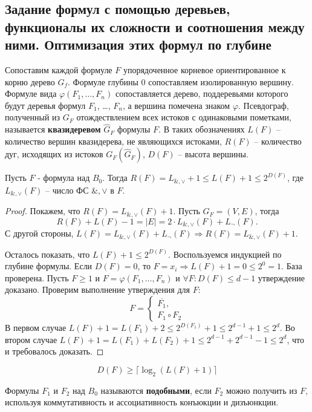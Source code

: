 \documentclass[11pt]{article}
\newcounter{th}\setcounter{th}{0}
\newcounter{cnsqnc}\setcounter{cnsqnc}{0}
\def\cnsqnc{\par\smallskip\refstepcounter{cnsqnc}\textbf{\arabic{cnsqnc}}}
\newtheorem*{Consequence}{Следствие \cnsqnc}
\newcounter{stnmt}\setcounter{stnmt}{0}
\def\st{\par\smallskip\refstepcounter{stnmt}\textbf{\arabic{stnmt}}}
\newtheorem*{Statement}{Утверждение \st}
\begin{document}
\subsection{Задание формул с помощью деревьев, функционалы их сложности и соотношения между ними. Оптимизация этих формул по глубине}
\label{sec:orga1d77b5}
Сопоставим каждой формуле \(F\) упорядоченное корневое ориентированное к корню дерево \(G_f\).
Формуле глубины \(0\) сопоставляем изолированную вершину. Формуле вида \(\varphi(F_1, \ldots, F_n)\)
сопоставляется дерево, поддеревьями которого будут деревья формул \(F_1\), \ldots, \(F_n\), а вершина
помечена знаком \(\varphi\). Псевдограф, полученный из \(G_F\) отождествлением всех истоков с
одинаковыми пометками, называется \textbf{квазидеревом} \(\hat{G}_F\) формулы \(F\). В таких обозначениях
\(L(F)\) -- количество вершин квазидерева, не являющихся истоками, \(R(F)\) -- количество дуг,
исходящих из истоков \(G_F(\hat{G}_F)\), \(D(F)\) -- высота вершины.
\begin{Statement}
Пусть $F$ - формула над $B_0$. Тогда $R(F)  = L_{\&, \vee} + 1 \leq L(F) + 1 \leq 2^{D(F)}$,
где $L_{\&, \vee}(F)$ -- число ФС $\&, \vee$ в $F$.
\end{Statement}
\begin{proof}
Покажем, что $R(F) = L_{\&, \vee}(F) + 1$. Пусть $G_F = (V, E)$, тогда
\begin{equation}
R(F) + L(F) - 1 = |E| = 2\cdot L_{\&, \vee}(F) + L_{\neg}(F).
\end{equation}
С другой стороны, $L(F) = L_{\&, \vee}(F) + L_{\neg}(F) \Rightarrow R(F) = L_{\&, \vee}(F) + 1$.

Осталось показать, что $L(F) + 1 \leq 2^{D(F)}$. Воспользуемся индукцией по глубине формулы.
Если $D(F) = 0$, то $F = x_i \Rightarrow L(F) + 1 = 0 \leq 2^0 = 1$. База проверена.
Пусть $F \geq 1$ и $F = \varphi(F_1, \ldots, F_n)$ и $\forall F: D(F) \leq d - 1$ утверждение
доказано. Проверим выполнение утверждения для $F$:
\begin{equation}
F = \begin{cases}
\overline{F_1}, \\
F_1\circ F_2
\end{cases}
\end{equation}
В первом случае $L(F) + 1 = L(F_1) + 2 \leq 2^{D(F_1)} + 1 \leq 2^{d - 1} + 1 \leq 2^d$.
Во втором случае $L(F) + 1 = L(F_1) + L(F_2) + 1 \leq 2^{d - 1} + 2^{d - 1} - 1 \leq 2^d$, что
и требовалось доказать.
\end{proof}
\begin{Consequence}
\begin{equation*}
D(F) \geq \lceil\log_2(L(F) + 1)\rceil
\end{equation*}
\end{Consequence}
Формулы $F_1$ и $F_2$ над $B_0$ называются \textbf{подобными}, если $F_2$ можно получить из $F$,
используя коммутативность и ассоциативность конъюкции и дизъюнкции.
\end{document}

